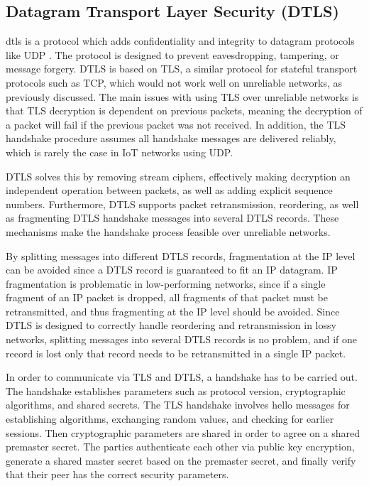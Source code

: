 \documentclass[0-thesis.tex]{subfiles}
\begin{document}
\subsection{Datagram Transport Layer Security (DTLS)}
\label{ssec:dtls}
\acrfull{dtls} is a protocol which adds confidentiality and integrity to datagram
protocols like UDP \parencite{rfc6347}. The protocol is designed to prevent eavesdropping,
tampering, or message forgery. DTLS is based on TLS, a similar protocol for stateful
transport protocols such as TCP, which would not work well on unreliable networks, as
previously discussed. The main issues with using TLS over unreliable networks is that TLS
decryption is dependent on previous packets, meaning the decryption of a packet will fail
if the previous packet was not received. In addition, the TLS handshake procedure assumes
all handshake messages are delivered reliably, which is rarely the case in IoT networks
using UDP.

DTLS solves this by removing stream ciphers, effectively making decryption an independent
operation between packets, as well as adding explicit sequence numbers. Furthermore, DTLS
supports packet retransmission, reordering, as well as fragmenting DTLS handshake messages
into several DTLS records. These mechanisms make the handshake process feasible over
unreliable networks. 

By splitting messages into different DTLS records, fragmentation at the IP level can be
avoided since a DTLS record is guaranteed to fit an IP datagram. IP fragmentation is
problematic in low-performing networks, since if a single fragment of an IP packet is
dropped, all fragments of that packet must be retransmitted, and thus fragmenting at the IP
level should be avoided. Since DTLS is designed to correctly handle reordering and
retransmission in lossy networks, splitting messages into several DTLS records is no
problem, and if one record is lost only that record needs to be retransmitted in a single
IP packet.

In order to communicate via TLS and DTLS, a handshake has to be carried out. The handshake
establishes parameters such as protocol version, cryptographic algorithms, and shared
secrets. The TLS handshake involves hello messages for establishing algorithms, exchanging
random values, and checking for earlier sessions. Then cryptographic parameters are shared
in order to agree on a shared premaster secret. The parties authenticate each other via
public key encryption, generate a shared master secret based on the premaster secret, and
finally verify that their peer has the correct security parameters.
\end{document}
